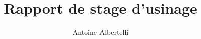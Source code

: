 \documentclass[a4paper]{report}
\author{Antoine Albertelli}
\title{Rapport de stage d'usinage}
\begin{document}

\tableofcontents
\cite{eccs-70}

\appendix



\end{document}
